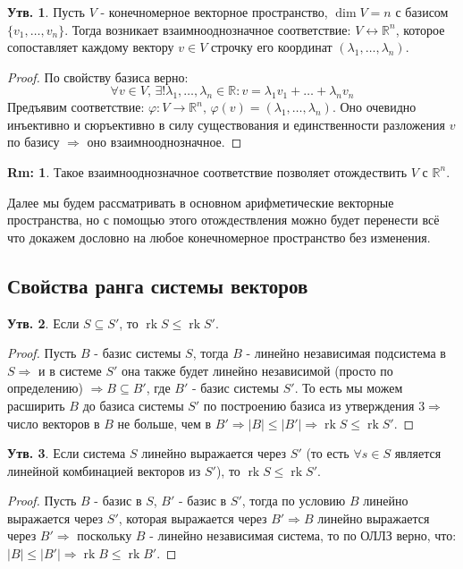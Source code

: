 \documentclass[12pt]{article}
\newcommand{\MR}{\mathbb{R}}
\theoremstyle{definition}
\newtheorem{rem}{Rm:}
\newtheorem{prop}{Утв.}
\DeclareMathOperator{\rk}{\text{rk}}
\begin{document}
\begin{prop}
	Пусть $V$ - конечномерное векторное пространство, $\dim{V} = n$ с базисом $\{v_1,\dotsc, v_n\}$. Тогда возникает взаимнооднозначное соответствие: $V \leftrightarrow \MR^n$, которое сопоставляет каждому вектору $v \in V$ строчку его координат $(\lambda_1,\dotsc,\lambda_n)$.
\end{prop}
\begin{proof}
	По свойству базиса верно: 
	$$
		\forall v \in V, \, \exists ! \lambda_1, \dotsc, \lambda_n \in \MR \colon v = \lambda_1 v_1 + \dotsc + \lambda_n v_n
	$$
	Предъявим соответствие: $\varphi \colon V \to \MR^n, \, \varphi(v) = (\lambda_1, \dotsc, \lambda_n)$. Оно очевидно инъективно и сюръективно в силу существования и единственности разложения $v$ по базису $\Rightarrow$ оно взаимнооднозначное.
\end{proof}
\begin{rem}
	Такое взаимнооднозначное соответствие позволяет отождествить $V$ с $\MR^n$.
\end{rem}
Далее мы будем рассматривать в основном арифметические векторные пространства, но с помощью этого отождествления можно будет перенести всё что докажем дословно на любое конечномерное пространство без изменения.


\subsection*{Свойства ранга системы векторов}

\begin{prop}
	Если $S \subseteq S'$, то $\rk{S} \leq \rk{S'}$.
\end{prop}
\begin{proof}
	Пусть $B$ - базис системы $S$, тогда $B$ - линейно независимая подсистема в $S \Rightarrow$ и в системе $S'$ она также будет линейно независимой (просто по определению) $\Rightarrow B \subseteq B'$, где $B'$ - базис системы $S'$. То есть мы можем расширить $B$ до базиса системы $S'$ по построению базиса из утверждения $3 \Rightarrow$ число векторов в $B$ не больше, чем в $B' \Rightarrow |B| \leq |B'| \Rightarrow \rk{S} \leq \rk{S'}$. 
\end{proof}

\begin{prop}
	Если система $S$ линейно выражается через $S'$ (то есть  $\forall s \in S$ является линейной комбинацией векторов из $S'$), то $\rk{S} \leq \rk{S'}$.
\end{prop}
\begin{proof}
	Пусть $B$ - базис в $S$, $B'$ - базис в $S'$, тогда по условию $B$ линейно выражается через $S'$, которая выражается через $B' \Rightarrow B$ линейно выражается через $B' \Rightarrow$  поскольку $B$ - линейно независимая система, то по ОЛЛЗ верно, что: $|B| \leq |B'| \Rightarrow \rk{B} \leq \rk{B'}$.
\end{proof}
\end{document}
